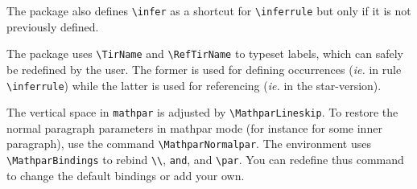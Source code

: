 \documentclass {article}
\let \lst \verb
\begin{document}
The package also defines \verb"\infer" as a shortcut for \verb"\inferrule"
but only if it is not previously defined. 

The package uses \verb"\TirName" and \verb"\RefTirName" to typeset labels,
which can safely be redefined by the user. The former is used for defining
occurrences ({\em ie.} in rule \lst"\inferrule") while the latter is used
for referencing ({\em ie.} in the star-version). 

The vertical space in \verb"mathpar" is adjusted by
\verb"\MathparLineskip". To restore the normal paragraph parameters in mathpar
mode (for instance for some inner paragraph), use the command
\verb"\MathparNormalpar".  
The environment uses \verb"\MathparBindings" to
rebind \verb"\\", \verb"and", and \verb"\par". You can redefine thus command
to change the default bindings or add your own. 
\end{document}

